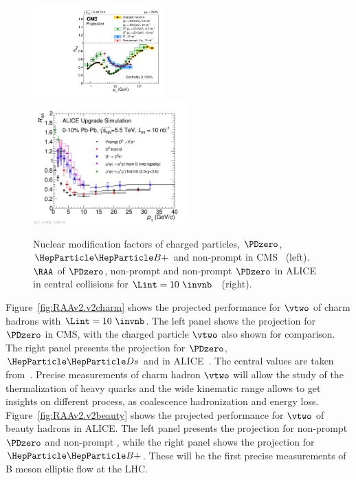 \begin{figure}[ht]
  \begin{center}
    \includegraphics[width=0.45\textwidth]{hf/figures/cRAA_lumiTG_10_lumiMB_0_v2_right.pdf}
   \includegraphics[width=0.54\textwidth]{hf/figures/ALICEUpgrade_charmbeautyRAA.pdf}
    \caption{Nuclear modification factors of charged particles, $\PDzero$, $\PBp$ and non-prompt \PJGy in CMS~\cite{CMS-PAS-FTR-17-002} (left). $\RAA$ of $\PDzero$, non-prompt \PJGy and non-prompt $\PDzero$ in ALICE in central \PbPb collisions for $\Lint=10~\invnb$~\cite{Abelev:1625842} (right).}
    \label{fig:RAAv2.RAA}
  \end{center}
\end{figure}


Figure~\ref{fig:RAAv2.v2charm} shows the projected performance for $\vtwo$ of charm hadrons with $\Lint=10~\invnb$. The left panel shows the projection for $\PDzero$ in CMS, with the charged particle $\vtwo$ also shown for comparison. The right panel presents the projection for $\PDzero$, $\PDs$ and \PGLc in ALICE~\cite{Abelev:1625842}. The central values are taken from~\cite{v2charmtheory}. Precise measurements of charm hadron $\vtwo$ will allow the study of the thermalization of heavy quarks and the wide kinematic range allows to get insights on different process, as coalescence hadronization and energy loss. Figure~\ref{fig:RAAv2.v2beauty} shows the projected performance for $\vtwo$ of beauty hadrons in ALICE. The left panel presents the projection for non-prompt $\PDzero$ and non-prompt \PJGy, while the right panel shows the projection for $\PBp$. These will be the first precise measurements of B meson elliptic flow at the LHC.

